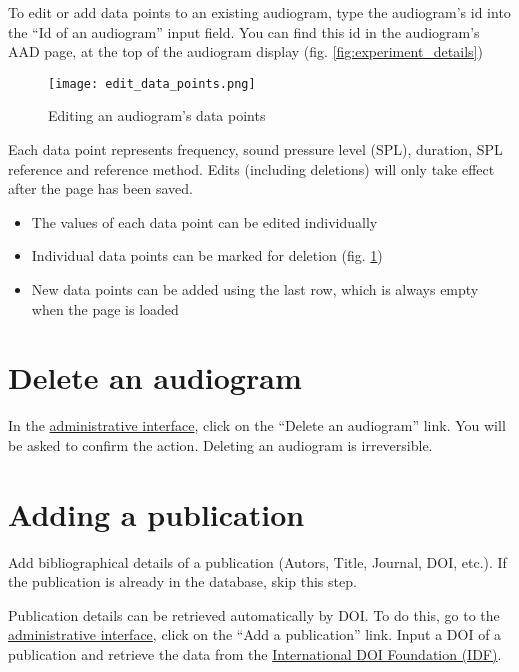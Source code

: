 \documentclass{article}
\begin{document}
To edit or add data points to an existing audiogram, type the audiogram's id into the ``Id of an audiogram'' input field. You can find this id in the audiogram's AAD page, at the top of the audiogram display (fig. \ref{fig:experiment_details})

\begin{figure}
\texttt{[image: edit\_data\_points.png]}
\caption{Editing an audiogram's data points}
\label{fig:edit_data_points}
\end{figure}

Each data point represents frequency, sound pressure level (SPL), duration, SPL reference and reference method. Edits (including deletions) will only take effect after the page has been saved.
\begin{itemize}
\item{The values of each data point can be edited individually}
\item{Individual data points can be marked for deletion (fig. \ref{fig:edit_data_points})}
\item{New data points can be added using the last row, which is always empty when the page is loaded}
\end{itemize}


\section{Delete an audiogram}
In the \href{https://animalaudiograms.museumfuernaturkunde.berlin/admin/v1/start}{administrative interface}, click on the ``Delete an audiogram'' link. You will be asked to confirm the action. Deleting an audiogram is irreversible.

\section{Adding a publication}
Add bibliographical details of a publication (Autors, Title, Journal, DOI, etc.). If the publication is already in the database, skip this step.

Publication details can be retrieved automatically by DOI. To do this, go to the \href{https://animalaudiograms.museumfuernaturkunde.berlin/admin/v1/start}{administrative interface}, click on the ``Add a publication'' link. Input a DOI of a publication and retrieve the data from the \href{https://www.doi.org/}{International DOI Foundation (IDF)}.
\end{document}
